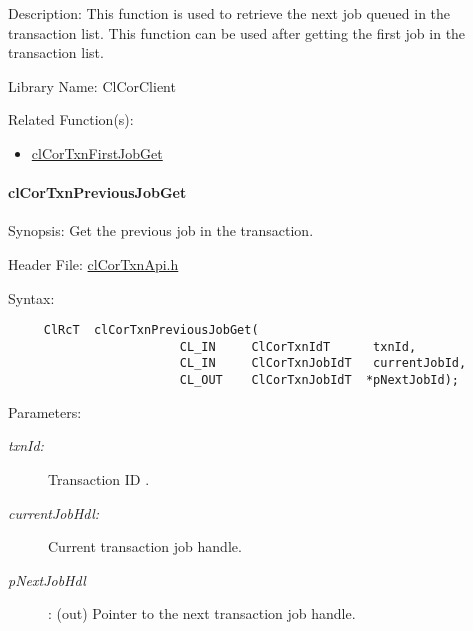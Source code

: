 \begin{Desc}
\item[Description:]This function is used to retrieve the next job queued in the transaction list. This function can be used after getting the first job in the transaction list.\end{Desc}
\begin{Desc}
\item[Library Name:]Cl\-Cor\-Client\end{Desc}
\begin{Desc}
\item[Related Function(s):]\begin{itemize}
\item \hyperlink{group__group13}{cl\-Cor\-Txn\-First\-Job\-Get} \end{itemize}
\end{Desc}
\hypertarget{pagecor515}{}\paragraph{cl\-Cor\-Txn\-Previous\-Job\-Get}\label{pagecor515}
\begin{Desc}
\item[Synopsis:]Get the previous job in the transaction.\end{Desc}
\begin{Desc}
\item[Header File:]\hyperlink{cl_cor_txn_api_8h}{cl\-Cor\-Txn\-Api.h}\end{Desc}
\begin{Desc}
\item[Syntax:]

\footnotesize\begin{verbatim}     ClRcT  clCorTxnPreviousJobGet(
                        CL_IN     ClCorTxnIdT      txnId,
                        CL_IN     ClCorTxnJobIdT   currentJobId,
                        CL_OUT    ClCorTxnJobIdT  *pNextJobId);
\end{verbatim}
\normalsize
\end{Desc}
\begin{Desc}
\item[Parameters:]
\begin{description}
\item[{\em txn\-Id:}]Transaction ID . \item[{\em current\-Job\-Hdl:}]Current transaction job handle. \item[{\em p\-Next\-Job\-Hdl}]: (out) Pointer to the next transaction job handle.\end{description}
\end{Desc}
